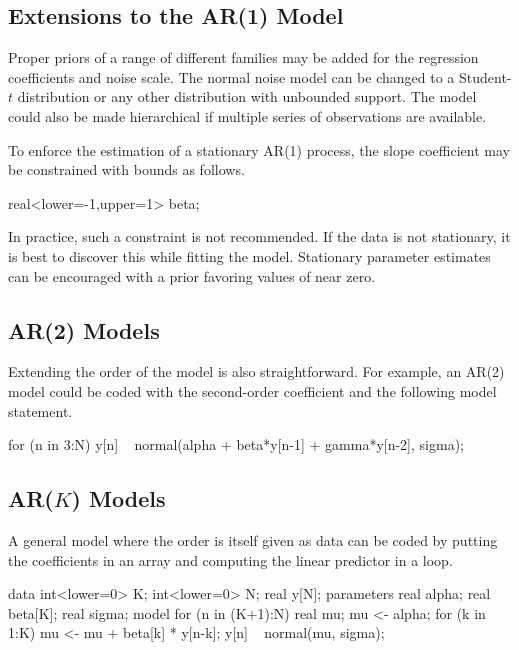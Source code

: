 \subsection{Extensions to the AR(1) Model} 

Proper priors of a range of different families may be added for the
regression coefficients and noise scale.  The normal noise model can
be changed to a Student-$t$ distribution or any other distribution
with unbounded support.  The model could also be made hierarchical if
multiple series of observations are available.  

To enforce the estimation of a stationary AR(1) process, the slope
coefficient  may be constrained with bounds as follows.
%
\begin{stancode}
real<lower=-1,upper=1> beta;
\end{stancode}
%
In practice, such a constraint is not recommended.  If the data is not
stationary, it is best to discover this while fitting the model.
Stationary parameter estimates can be encouraged with a prior favoring
values of  near zero.


\subsection{AR(2) Models}

Extending the order of the model is also straightforward.  For
example, an AR(2) model could be coded with the second-order
coefficient  and the following model statement.
%
\begin{stancode}
for (n in 3:N)
  y[n] ~ normal(alpha + beta*y[n-1] + gamma*y[n-2], sigma);
\end{stancode}


\subsection{AR($K$) Models}

A general model where the order is itself given as data can be coded
by putting the coefficients in an array and computing the linear
predictor in a loop.
%
\begin{stancode}
data {
  int<lower=0> K;
  int<lower=0> N;
  real y[N];
}
parameters {
  real alpha;
  real beta[K];
  real sigma;
}
model {
  for (n in (K+1):N) {
    real mu;
    mu <- alpha;
    for (k in 1:K)
      mu <- mu + beta[k] * y[n-k];
    y[n] ~ normal(mu, sigma);
  }
}
\end{stancode}

